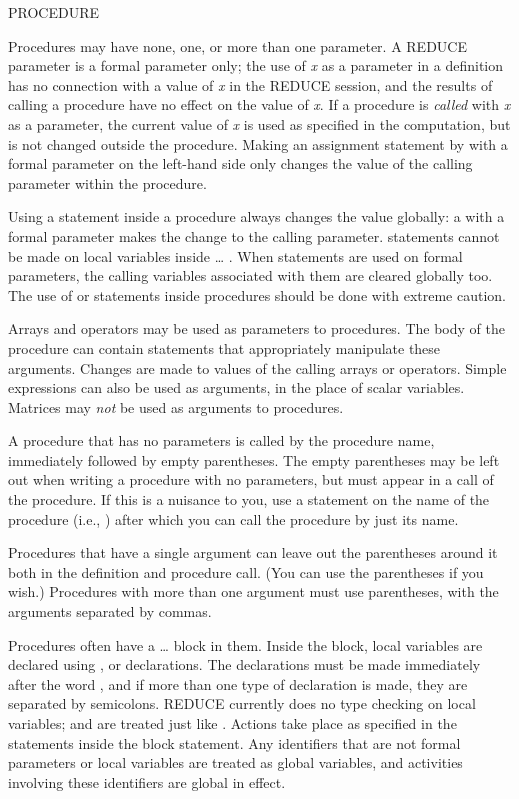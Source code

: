 \begin{Command}{PROCEDURE}
\begin{Comments}
Procedures may have none, one, or more than one parameter.  A REDUCE
parameter is a formal parameter only; the use of {\it x} as a parameter in
a  definition has no connection with a value of {\it x} in
the REDUCE session, and the results of calling a procedure have no effect
on the value of {\it x}.  If a procedure is {\it called} with {\it x} as a
parameter, the current value of {\it x} is used as specified in the
computation, but is not changed outside the procedure.
Making an assignment statement by \name{:=} with a
formal parameter on the left-hand side only changes the value of the
calling parameter within the procedure.

Using a  statement inside a procedure always changes the value
globally: a  with a formal parameter makes the change to the calling
parameter.   statements cannot be made on local variables inside
\ldots{} .  
When  statements are used on formal
parameters, the calling variables associated with them are cleared globally too.
The use of  or  statements inside procedures 
should be done with extreme caution.

Arrays and operators may be used as parameters to procedures.  The body of the
procedure can contain statements that appropriately manipulate these
arguments.  Changes are made to values of the calling arrays or operators.
Simple expressions can also be used as arguments, in the place of scalar
variables.  Matrices may {\it not} be used as arguments to procedures.

A procedure that has no parameters is called by the procedure name,
immediately followed by empty parentheses.  The empty parentheses may be left
out when writing a procedure with no parameters, but must appear in a call of
the procedure.  If this is a nuisance to you, use a  statement on
the name of the procedure (i.e., ) after which
you can call the procedure by just its name.

Procedures that have a single argument can leave out the parentheses around
it both in the definition and procedure call.  (You can use the parentheses if
you wish.)  Procedures with more than one argument must use parentheses, with
the arguments separated by commas.

Procedures often have a \ldots{} block in them. Inside the
block, local variables are declared using ,  or 
 declarations.  
The declarations must be made immediately after the word
, and if more than one type of declaration is made, they are
separated by semicolons.  REDUCE currently does no type checking on local
variables;  and  are treated just like .
Actions take place as specified in the statements inside the block statement.
Any identifiers that are not formal parameters or local variables are treated
as global variables, and activities involving these identifiers are global in
effect.


\end{Comments}
\end{Command}

